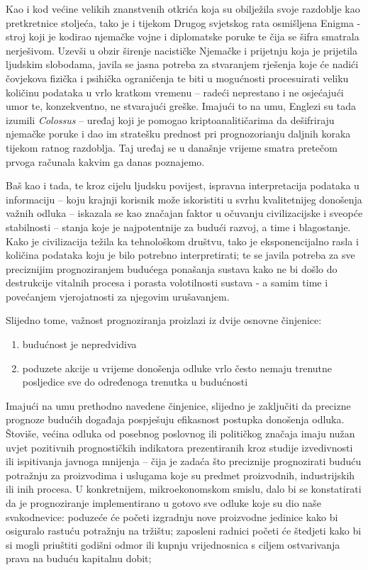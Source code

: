 \documentclass[a4paper,12pt,oneside]{memoir}
\begin{document}
        Kao i kod većine velikih znanstvenih otkrića koja su obilježila svoje razdoblje kao pretkretnice stoljeća, tako je i tijekom Drugog svjetskog rata osmišljena Enigma - stroj koji je kodirao njemačke vojne i diplomatske poruke te čija se šifra smatrala nerješivom. Uzevši u obzir širenje nacističke Njemačke i prijetnju koja je prijetila ljudskim slobodama, javila se jasna potreba za stvaranjem rješenja koje će nadići čovjekova fizička i psihička ograničenja te biti u mogućnosti procesuirati veliku količinu podataka u vrlo kratkom vremenu -- radeći neprestano i ne osjećajući umor te, konzekventno, ne stvarajući greške. Imajući to na umu, Englezi su tada izumili \textit{Colossus} -- uređaj koji je pomogao kriptoanalitičarima da dešifriraju njemačke poruke i dao im stratešku prednost pri prognozorianju daljnih koraka tijekom ratnog razdoblja. Taj uređaj se u današnje vrijeme smatra pretečom prvoga računala kakvim ga danas poznajemo.

        Baš kao i tada, te kroz cijelu ljudsku povijest, ispravna interpretacija podataka u informaciju -- koju krajnji korisnik može iskoristiti u svrhu kvalitetnijeg donošenja važnih odluka -- iskazala se kao značajan faktor u očuvanju civilizacijske i sveopće stabilnosti -- stanja koje je najpotentnije za budući razvoj, a time i blagostanje. Kako je civilizacija težila ka tehnološkom društvu, tako je eksponencijalno rasla i količina podataka koju je bilo potrebno interpretirati; te se javila potreba za sve preciznijim prognoziranjem budućega ponašanja sustava kako ne bi došlo do destrukcije vitalnih procesa i porasta volotilnosti sustava - a samim time i povećanjem vjerojatnosti za njegovim urušavanjem.

        Slijedno tome, važnost prognoziranja proizlazi iz dvije osnovne činjenice:
        \begin{enumerate}
            \item budućnost je nepredvidiva
            \item poduzete akcije u vrijeme donošenja odluke vrlo često nemaju trenutne posljedice sve do određenoga trenutka u budućnosti
        \end{enumerate}

        Imajući na umu prethodno navedene činjenice, slijedno je zaključiti da precizne prognoze budućih događaja pospješuju efikasnost postupka donošenja odluka. Štoviše, većina odluka od posebnog poslovnog ili političkog značaja imaju nužan uvjet pozitivnih prognostičkih indikatora prezentiranih kroz studije izvedivnosti ili ispitivanja javnoga mnijenja -- čija je zadaća što preciznije prognozirati buduću potražnju za proizvodima i uslugama koje su predmet proizvodnih, industrijskih ili inih procesa. U konkretnijem, mikroekonomskom smislu, dalo bi se konstatirati da je prognoziranje implementirano u gotovo sve odluke koje su dio naše svakodnevice: poduzeće će početi izgradnju nove proizvodne jedinice kako bi osiguralo rastuću potražnju na tržištu; zaposleni radnici početi će štedjeti kako bi si mogli priuštiti godišni odmor ili kupnju vrijednosnica s ciljem ostvarivanja prava na buduću kapitalnu dobit; 
\end{document}
